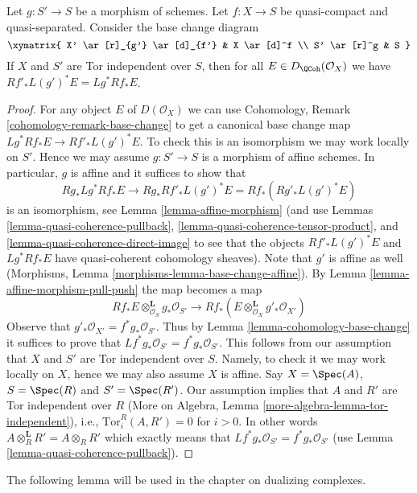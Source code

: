 \begin{lemma}
\label{lemma-compare-base-change}
Let $g : S' \to S$ be a morphism of schemes.
Let $f : X \to S$ be quasi-compact and quasi-separated.
Consider the base change diagram
$$
\xymatrix{
X' \ar[r]_{g'} \ar[d]_{f'} &
X \ar[d]^f \\
S' \ar[r]^g &
S
}
$$
If $X$ and $S'$ are Tor independent over $S$, then for all
$E \in D_\QCoh(\mathcal{O}_X)$ we have
$Rf'_*L(g')^*E = Lg^*Rf_*E$.
\end{lemma}

\begin{proof}
For any object $E$ of $D(\mathcal{O}_X)$ we can use
Cohomology, Remark \ref{cohomology-remark-base-change} to get a
canonical base change map $Lg^*Rf_*E \to Rf'_*L(g')^*E$. To check this
is an isomorphism we may work locally on $S'$. Hence we may assume
$g : S' \to S$ is a morphism of affine schemes. In particular, $g$
is affine and it suffices to show that
$$
Rg_*Lg^*Rf_*E \to Rg_*Rf'_*L(g')^*E = Rf_*(Rg'_* L(g')^* E)
$$
is an isomorphism, see Lemma \ref{lemma-affine-morphism}
(and use Lemmas \ref{lemma-quasi-coherence-pullback},
\ref{lemma-quasi-coherence-tensor-product}, and
\ref{lemma-quasi-coherence-direct-image}
to see that the objects $Rf'_*L(g')^*E$ and $Lg^*Rf_*E$
have quasi-coherent cohomology sheaves). Note that $g'$ is
affine as well (Morphisms, Lemma \ref{morphisms-lemma-base-change-affine}).
By Lemma \ref{lemma-affine-morphism-pull-push} the map becomes a map
$$
Rf_*E \otimes_{\mathcal{O}_S}^\mathbf{L} g_*\mathcal{O}_{S'}
\longrightarrow
Rf_*(E \otimes_{\mathcal{O}_X}^\mathbf{L} g'_*\mathcal{O}_{X'})
$$
Observe that $g'_*\mathcal{O}_{X'} = f^*g_*\mathcal{O}_{S'}$. Thus by
Lemma \ref{lemma-cohomology-base-change} it suffices to prove that
$Lf^*g_*\mathcal{O}_{S'} = f^*g_*\mathcal{O}_{S'}$. This follows from our
assumption that $X$ and $S'$ are Tor independent over $S$. Namely, to
check it we may work locally on $X$, hence we may also assume $X$ is affine.
Say $X = \Spec(A)$, $S = \Spec(R)$ and $S' = \Spec(R')$. Our assumption
implies that $A$ and $R'$ are Tor independent over $R$
(More on Algebra, Lemma \ref{more-algebra-lemma-tor-independent}), i.e.,
$\text{Tor}_i^R(A, R') = 0$ for $i > 0$. In other words
$A \otimes_R^\mathbf{L} R' = A \otimes_R R'$ which exactly means
that $Lf^*g_*\mathcal{O}_{S'} = f^*g_*\mathcal{O}_{S'}$
(use Lemma \ref{lemma-quasi-coherence-pullback}).
\end{proof}

\noindent
The following lemma will be used in the chapter on dualizing complexes.

